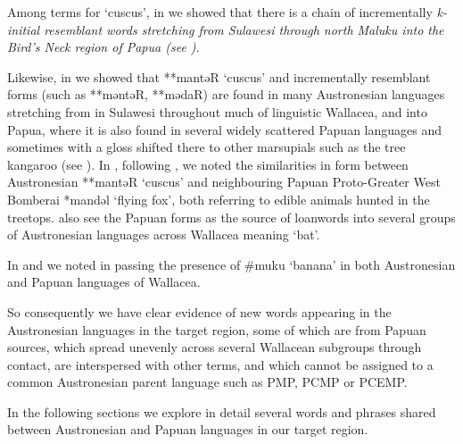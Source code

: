 Among terms for `cuscus', in  we showed
that there is a chain of incrementally \it{k}-initial
resemblant words stretching from Sulawesi through north Maluku
into the Bird’s Neck region of Papua (see ).

Likewise, in  we showed that **mantəR ‘cuscus’
and incrementally resemblant forms (such as **məntəR,
**mədaR) are found in many Austronesian languages stretching
from  in Sulawesi throughout much of linguistic
Wallacea, and into Papua, where it is also found in several widely scattered
Papuan languages and sometimes with a gloss shifted there to other marsupials
such as the tree kangaroo (see ).
In , following \cite[269]{Schapper2011},
we noted the similarities in form between Austronesian
**mantəR ‘cuscus’ and neighbouring Papuan
Proto-Greater West Bomberai *mandəl ‘flying fox’,
both referring to edible animals hunted in the treetops.
\citet[486]{UsherSchapper2022} also see the Papuan forms as the
source of loanwords into several groups of Austronesian languages
across Wallacea meaning ‘bat’.

In  and  we noted in passing the
presence of {\#}muku `banana' in both Austronesian and
Papuan languages of Wallacea.

So consequently we have clear evidence of new words appearing
in the Austronesian languages in the target region,
some of which are from Papuan sources,
which spread unevenly across several Wallacean subgroups through
contact, are interspersed with other terms,
and which cannot be assigned to a common Austronesian parent
language such as PMP, PCMP or PCEMP.

In the following sections we explore in
detail several words and phrases shared
between Austronesian and Papuan languages in our target region.